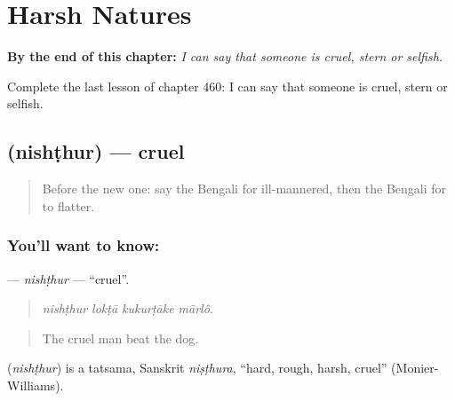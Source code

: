 
\chapter{Harsh Natures}
\label{ch:bn-harsh-natures}

\begin{chapteropening}
\textbf{By the end of this chapter:} \emph{I can say that someone is cruel, stern or selfish.}

Complete the last lesson of chapter 460: I can say that someone is cruel, stern or selfish.
\end{chapteropening}

\section[\texorpdfstring{\bn{নিষ্ঠুর} (nishṭhur)}{নিষ্ঠুর (nishṭhur)}]{ (nishṭhur) — cruel}

\label{lesson:BN-C460-nishthur}



\begin{quote}
Before the new one: say the Bengali for ill-mannered, then the Bengali for to flatter.
\end{quote}

\subsection*{You'll want to know: }
\textbf{} — \emph{nishṭhur} — \textquotedblleft{}cruel\textquotedblright{}.

\begin{quote}
   
\end{quote}

\begin{quote}
\emph{nishṭhur lokṭā kukurṭāke mārlô.}
\end{quote}

\begin{quote}
The cruel man beat the dog.
\end{quote}

\begin{cousinweb}
\textbf{} (\emph{nishṭhur}) is a tatsama, Sanskrit \emph{niṣṭhura}, \textquotedblleft{}hard, rough, harsh, cruel\textquotedblright{} (Monier-Williams).
\end{cousinweb}

